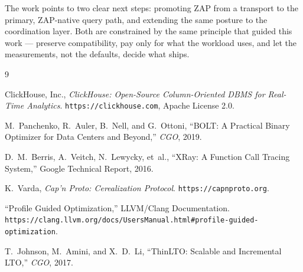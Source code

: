 The work points to two clear next steps: promoting ZAP from a transport to the
primary, ZAP-native query path, and extending the same posture to the
coordination layer. Both are constrained by the same principle that guided this
work --- preserve compatibility, pay only for what the workload uses, and let the
measurements, not the defaults, decide what ships.

\begin{thebibliography}{9}

ClickHouse, Inc.,
\newblock \textit{ClickHouse: Open-Source Column-Oriented DBMS for Real-Time
Analytics}.
\newblock \texttt{https://clickhouse.com}, Apache License 2.0.

M.~Panchenko, R.~Auler, B.~Nell, and G.~Ottoni,
\newblock ``BOLT: A Practical Binary Optimizer for Data Centers and Beyond,''
\newblock \textit{CGO}, 2019.

D.~M.~Berris, A.~Veitch, N.~Lewycky, et~al.,
\newblock ``XRay: A Function Call Tracing System,''
\newblock Google Technical Report, 2016.

K.~Varda,
\newblock \textit{Cap'n Proto: Cerealization Protocol}.
\newblock \texttt{https://capnproto.org}.

\newblock ``Profile Guided Optimization,'' LLVM/Clang Documentation.
\newblock \texttt{https://clang.llvm.org/docs/UsersManual.html\#profile-guided-optimization}.

T.~Johnson, M.~Amini, and X.~D.~Li,
\newblock ``ThinLTO: Scalable and Incremental LTO,''
\newblock \textit{CGO}, 2017.

\end{thebibliography}

